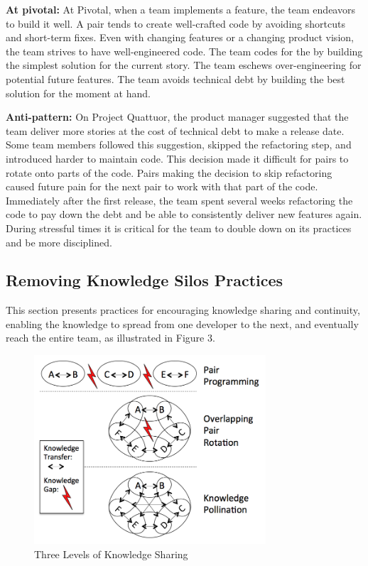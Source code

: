 \begin{table}[]
\textbf{At pivotal:} At Pivotal, when a team implements a feature, the team endeavors to build it well. A pair tends to create well-crafted code by avoiding shortcuts and short-term fixes. Even with changing features or a changing product vision, the team strives to have well-engineered code. The team codes for the  by building the simplest solution for the current story. The team eschews over-engineering for potential future features. The team avoids technical debt by building the best solution for the moment at hand.  

\textbf{Anti-pattern:} On Project Quattuor, the product manager suggested that the team deliver more stories at the cost of technical debt to make a release date. Some team members followed this suggestion, skipped the refactoring step, and introduced harder to maintain code. This decision made it difficult for pairs to rotate onto parts of the code. Pairs making the decision to skip refactoring caused future pain for the next pair to work with that part of the code. Immediately after the first release, the team spent several weeks refactoring the code to pay down the debt and be able to consistently deliver new features again. During stressful times it is critical for the team to double down on its practices and be more disciplined.
\subsection{Removing Knowledge Silos Practices}
This section presents practices for encouraging knowledge sharing and continuity, enabling the knowledge to spread from one developer to the next, and eventually reach the entire team, as illustrated in Figure 3.

\begin{figure}[t]
\centering
\includegraphics[width=3.4in]{KnowledgeSharingLevels.png}
\caption{Three Levels of Knowledge Sharing}
\label{KnowledgeSharing}
\end{figure}


\end{table}

